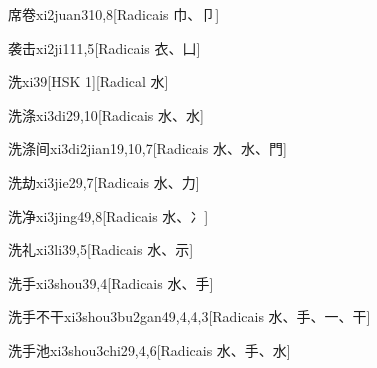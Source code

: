 \begin{entry}{席卷}{xi2juan3}{10,8}[Radicais ⼱、⼙]
\end{entry}

\begin{entry}{袭击}{xi2ji1}{11,5}[Radicais ⾐、⼐]
\end{entry}

\begin{entry}{洗}{xi3}{9}[HSK 1][Radical ⽔]
\end{entry}

\begin{entry}{洗涤}{xi3di2}{9,10}[Radicais ⽔、⽔]
\end{entry}

\begin{entry}{洗涤间}{xi3di2jian1}{9,10,7}[Radicais ⽔、⽔、⾨]
\end{entry}

\begin{entry}{洗劫}{xi3jie2}{9,7}[Radicais ⽔、⼒]
\end{entry}

\begin{entry}{洗净}{xi3jing4}{9,8}[Radicais ⽔、⼎]
\end{entry}

\begin{entry}{洗礼}{xi3li3}{9,5}[Radicais ⽔、⽰]
\end{entry}

\begin{entry}{洗手}{xi3shou3}{9,4}[Radicais ⽔、⼿]
\end{entry}

\begin{entry}{洗手不干}{xi3shou3bu2gan4}{9,4,4,3}[Radicais ⽔、⼿、⼀、⼲]
\end{entry}

\begin{entry}{洗手池}{xi3shou3chi2}{9,4,6}[Radicais ⽔、⼿、⽔]
\end{entry}

